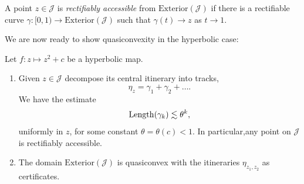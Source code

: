 \begin{definition}
	A point $z \in \mathcal J$ is \emph{rectifiably accessible} from $\mathrm{Exterior}(\mathcal J)$ if there is a rectifiable curve $\gamma: [0,1) \to \mathrm{Exterior}(\mathcal J)$ such that $\gamma (t) \to z$ as $t \to 1$.
\end{definition}

We are now ready to show quasiconvexity in the hyperbolic case:

\begin{theorem}  Let $f:z \mapsto z^2+c$ be a hyperbolic map. \leavevmode
\begin{enumerate}[label=\normalfont(\roman*)]

\item Given $z\in\mathcal{J}$ decompose its central itinerary into tracks, 
\begin{equation*}
\eta_z = \gamma _1 +\gamma_2 +\dots.
\end{equation*}
We have the estimate
\begin{equation*}
\operatorname{Length}(\gamma_{k})\lesssim\theta^{k},
\end{equation*}
uniformly in $z$, for some constant $\theta=\theta(c)<1$. 
In particular,any point on \(\mathcal{J}\) is rectifiably accessible.

\item The domain $\mathrm{Exterior}(\mathcal{J})$ is quasiconvex with the itineraries $\eta_{z_1,z_2}$ as certificates.
	\end{enumerate}
\end{theorem}

